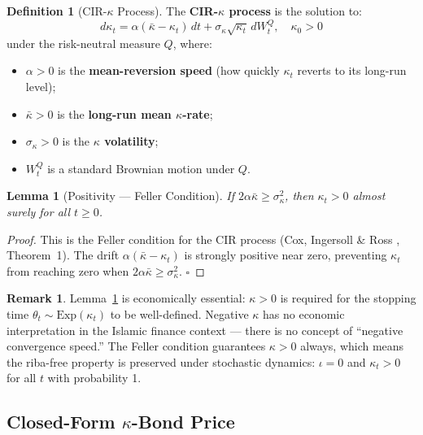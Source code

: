 \documentclass[10pt,twocolumn]{article}
\theoremstyle{plain}
\newtheorem{lemma}{Lemma}
\theoremstyle{definition}
\newtheorem{definition}{Definition}
\newtheorem{remark}{Remark}
\begin{document}
\begin{definition}[CIR-$\kappa$ Process]
\label{def:cir_kappa}
The \textbf{CIR-$\kappa$ process} is the solution to:
\begin{equation}
d\kappa_t = \alpha(\bar\kappa - \kappa_t)\,dt
+ \sigma_\kappa\sqrt{\kappa_t}\,dW_t^Q, \quad \kappa_0 > 0
\label{eq:cir_kappa}
\end{equation}
under the risk-neutral measure $Q$, where:
\begin{itemize}[leftmargin=*,noitemsep]
\item $\alpha > 0$ is the \textbf{mean-reversion speed}
(how quickly $\kappa_t$ reverts to its long-run level);
\item $\bar\kappa > 0$ is the \textbf{long-run mean
$\kappa$-rate};
\item $\sigma_\kappa > 0$ is the \textbf{$\kappa$ volatility};
\item $W_t^Q$ is a standard Brownian motion under $Q$.
\end{itemize}
\end{definition}

\begin{lemma}[Positivity — Feller Condition]
\label{lem:feller}
If $2\alpha\bar\kappa \geq \sigma_\kappa^2$, then
$\kappa_t > 0$ almost surely for all $t \geq 0$.
\end{lemma}

\begin{proof}
This is the Feller condition for the CIR process
(Cox, Ingersoll \& Ross \cite{CIR1985}, Theorem~1).
The drift $\alpha(\bar\kappa - \kappa_t)$ is strongly
positive near zero, preventing $\kappa_t$ from reaching
zero when $2\alpha\bar\kappa \geq \sigma_\kappa^2$.
\qquad$\square$
\end{proof}

\begin{remark}
Lemma~\ref{lem:feller} is economically essential: $\kappa > 0$
is required for the stopping time $\theta_t \sim
\mathrm{Exp}(\kappa_t)$ to be well-defined. Negative $\kappa$
has no economic interpretation in the Islamic finance context
--- there is no concept of ``negative convergence speed.''
The Feller condition guarantees $\kappa > 0$ always, which
means the riba-free property is preserved under stochastic
dynamics: $\iota = 0$ and $\kappa_t > 0$ for all $t$ with
probability 1.
\end{remark}

\subsection{Closed-Form $\kappa$-Bond Price}
\end{document}
